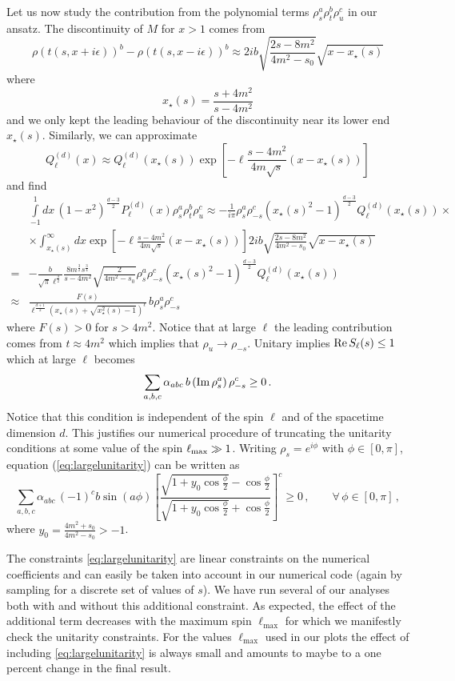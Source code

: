 \documentclass[12pt]{article}
\newcommand{\begBvR}[1]{\begin{#1}}
\newcommand{\beq}{\begBvR{equation}}
\newcommand{\eeq}{\end{equation}}
\newcommand{\<}{{\langle}}
\renewcommand{\>}{{\rangle}}
\begin{document}
Let us now study the contribution from the polynomial terms $\rho_s^a\rho_t^b\rho_u^c$ in our ansatz. The discontinuity of $M$ for $x>1$ comes from
\beq
\rho(t(s,x+i\epsilon))^{b} -\rho(t(s,x-i\epsilon))^{b} \approx
2i b \sqrt{\frac{2s-8m^2}{4m^2-s_0}} \sqrt{x-x_\star(s)}
\eeq
where 
\beq
x_\star(s)=\frac{s+4m^2}{s-4m^2}
\eeq
and we only kept the leading behaviour of the discontinuity near its lower end $x_\star(s)$.
Similarly, we can approximate
\beq
Q^{(d)}_\ell(x)\approx Q^{(d)}_\ell(x_\star(s)) \exp\left[{-\ell\frac{s-4m^2}{4m\sqrt{s}}(x-x_\star(s))}\right]
\eeq
and find
\begin{align}
&\int\limits_{-1}^1\! dx\, (1-x^2)^{\frac{d-3}{2}}P^{(d)}_\ell(x) \rho_s^a\rho_t^b\rho_u^c 
\approx
-\frac{1}{i\pi  } \rho_s^a \rho_{-s}^c 
(x_\star(s)^2-1)^{\frac{d-3}{2}}Q^{(d)}_\ell(x_\star(s)) \times \\
&\times \int_{x_\star(s)}^\infty dx 
\exp\left[{-\ell\frac{s-4m^2}{4m\sqrt{s}}(x-x_\star(s))}\right]
  2i b \sqrt{\frac{2s-8m^2}{4m^2-s_0}} \sqrt{x-x_\star(s)}
  \\
  =&-\frac{b}{ \sqrt{\pi} \ell^{\frac{3}{2} }}
   \frac{8m^{\frac{3}{2} }s^{\frac{3}{4} }}{s-4m^2} 
    \sqrt{\frac{2 }{4m^2-s_0}} 
   \rho_s^a \rho_{-s}^c 
(x_\star(s)^2-1)^{\frac{d-3}{2}}Q^{(d)}_\ell(x_\star(s)) \\
\approx&  \frac{F(s)}{\ell^\frac{d+1}{2}  \left(x_\star(s)+\sqrt{x_\star^2(s)-1}\right)^\ell}   \,b\rho_s^a \rho_{-s}^c
\end{align}
where $F(s)>0$ for $s>4m^2$. Notice that at large $\ell$ the leading contribution comes from $t \approx 4m^2$ which implies that $\rho_u \to \rho_{-s}$. Unitary implies ${\rm Re}\, S_\ell(s)\le 1$  which at large $\ell$ becomes
\beq
\sum_{a,b,c}\alpha_{abc} \,b\left({\rm Im}\,\rho_s^a\right) \rho_{-s}^c \ge 0\,.
\label{eq:largelunitarity}
\eeq
Notice that this condition is independent of the spin $\ell$ and of the spacetime dimension $d$. This justifies our numerical procedure of truncating the unitarity conditions at some value of the spin $\ell_{\rm max}\gg 1$.
Writing $\rho_s=e^{i\phi}$ with $\phi\in [0,\pi]$, equation (\ref{eq:largelunitarity}) can be written as
\beq
\sum_{a,b,c}\alpha_{abc} \,(-1)^c  b \sin( a \phi) 
\left[
\frac{\sqrt{1+y_0 \cos\frac{\phi}{2}} - \cos\frac{\phi}{2}}
{\sqrt{1+y_0 \cos\frac{\phi}{2}} + \cos\frac{\phi}{2}}
\right]^c \ge 0\,,\qquad \forall \,\phi\in [0,\pi]\,,
\eeq
where $y_0=\frac{4m^2+s_0}{4m^2-s_0}>-1$.

The constraints \eqref{eq:largelunitarity} are linear constraints on the numerical coefficients and can easily be taken into account in our numerical code (again by sampling for a discrete set of values of $s$). We have run several of our analyses both with and without this additional constraint. As expected, the effect of the additional term decreases with the maximum spin $\ell_{\max}$ for which we manifestly check the unitarity constraints. For the values $\ell_{\max}$ used in our plots the effect of including \eqref{eq:largelunitarity} is always small and amounts to maybe to a one percent change in the final result.
\end{document}
